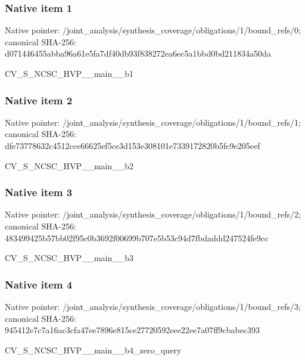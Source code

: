 \documentclass[10pt,a4paper]{article}
\begin{document}
\subsubsection{Native item 1}
Native pointer: /joint\_\allowbreak{}analysis/synthesis\_\allowbreak{}coverage/obligations/1/bound\_\allowbreak{}refs/0; canonical SHA-256: d071446455abba96a61e5fa7df40db93f838272ea6ec5a1bbd0bd211834a50da

\begingroup\raggedright\sloppy CV\_\allowbreak{}S\_\allowbreak{}NCSC\_\allowbreak{}HVP\_\allowbreak{}\_\allowbreak{}main\_\allowbreak{}\_\allowbreak{}b1\par\endgroup

\subsubsection{Native item 2}
Native pointer: /joint\_\allowbreak{}analysis/synthesis\_\allowbreak{}coverage/obligations/1/bound\_\allowbreak{}refs/1; canonical SHA-256: dfe73778632c4512cce66625ef5ce3d153e308101e7339172820b5fc9e205eef

\begingroup\raggedright\sloppy CV\_\allowbreak{}S\_\allowbreak{}NCSC\_\allowbreak{}HVP\_\allowbreak{}\_\allowbreak{}main\_\allowbreak{}\_\allowbreak{}b2\par\endgroup

\subsubsection{Native item 3}
Native pointer: /joint\_\allowbreak{}analysis/synthesis\_\allowbreak{}coverage/obligations/1/bound\_\allowbreak{}refs/2; canonical SHA-256: 483499425b57bb02f95c0b3692f00699b707e5b53c94d7fbdaddd247524fe9cc

\begingroup\raggedright\sloppy CV\_\allowbreak{}S\_\allowbreak{}NCSC\_\allowbreak{}HVP\_\allowbreak{}\_\allowbreak{}main\_\allowbreak{}\_\allowbreak{}b3\par\endgroup

\subsubsection{Native item 4}
Native pointer: /joint\_\allowbreak{}analysis/synthesis\_\allowbreak{}coverage/obligations/1/bound\_\allowbreak{}refs/3; canonical SHA-256: 945412e7c7a16ac3cfa47ee7896e815ce27720592eee22ee7a07ff9cbabec393

\begingroup\raggedright\sloppy CV\_\allowbreak{}S\_\allowbreak{}NCSC\_\allowbreak{}HVP\_\allowbreak{}\_\allowbreak{}main\_\allowbreak{}\_\allowbreak{}b4\_\allowbreak{}zero\_\allowbreak{}query\par\endgroup
\end{document}
